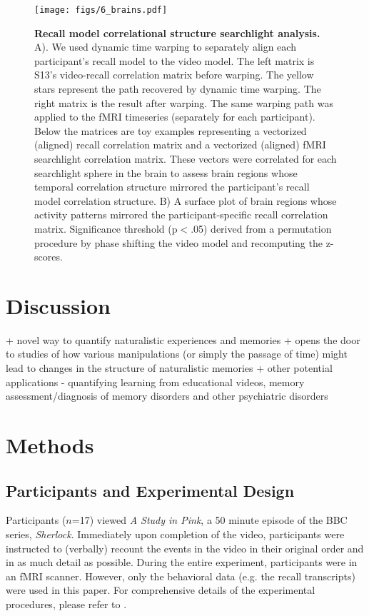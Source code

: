 \documentclass{article}
\begin{document}
{\begin{figure}[t!]
\centering
\texttt{[image: figs/6\_brains.pdf]}
\caption{\small \textbf{Recall model correlational structure searchlight analysis.} A). We used dynamic time warping to separately align each participant's recall model to the video model. The left matrix is S13's video-recall correlation matrix before warping. The yellow stars represent the path recovered by dynamic time warping. The right matrix is the result after warping. The same warping path was applied to the fMRI timeseries (separately for each participant). Below the matrices are toy examples representing a vectorized (aligned) recall correlation matrix and a vectorized (aligned) fMRI searchlight correlation matrix. These vectors were correlated for each searchlight sphere in the brain to assess brain regions whose temporal correlation structure mirrored the participant's recall model correlation structure. B) A surface plot of brain regions whose activity patterns mirrored the participant-specific recall correlation matrix. Significance threshold (p$<$.05) derived from a permutation procedure by phase shifting the video model and recomputing the z-scores.}
\label{fig:brainz}
\end{figure}

\section{Discussion}
\label{sec:discussion}

+ novel way to quantify naturalistic experiences and memories
+ opens the door to studies of how various manipulations (or simply the passage of time) might lead to changes in the structure of naturalistic memories
+ other potential applications - quantifying learning from educational videos, memory assessment/diagnosis of memory disorders and other psychiatric disorders

\section{Methods}
\label{sec:methods}

\subsection{Participants and Experimental Design}
Participants ($n$=17) viewed \textit{A Study in Pink}, a 50 minute episode of the BBC series, \textit{Sherlock}. Immediately upon completion of the video, participants were instructed to (verbally) recount the events in the video in their original order and in as much detail as possible. During the entire experiment, participants were in an fMRI scanner.  However, only the behavioral data (e.g. the recall transcripts) were used in this paper. For comprehensive details of the experimental procedures, please refer to \cite{ChenEtal17}.

}
\end{document}

